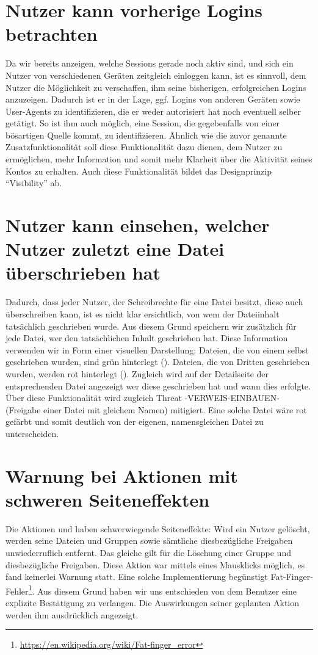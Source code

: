 \documentclass[12pt,DIV14,BCOR10mm,a4paper,parskip=half-,headsepline,headinclude,english,ngerman,bibliography=totocnumbered]{scrreprt}
\begin{document}
\section{Nutzer kann vorherige Logins betrachten}

Da wir bereits anzeigen, welche Sessions gerade noch aktiv sind, und sich ein Nutzer von verschiedenen Geräten zeitgleich einloggen kann, ist es sinnvoll, dem Nutzer die Möglichkeit zu verschaffen, ihm seine bisherigen, erfolgreichen Logins anzuzeigen.
Dadurch ist er in der Lage, ggf. Logins von anderen Geräten sowie User-Agents zu identifizieren, die er weder autorisiert hat noch eventuell selber getätigt.
So ist ihm auch möglich, eine Session, die gegebenfalls von einer bösartigen Quelle kommt, zu identifizieren.
Ähnlich wie die zuvor genannte Zusatzfunktionalität soll diese Funktionalität dazu dienen, dem Nutzer zu ermöglichen, mehr Information und somit mehr Klarheit über die Aktivität seines Kontos zu erhalten.
Auch diese Funktionalität bildet das Designprinzip \enquote{Visibility} ab.

\section{Nutzer kann einsehen, welcher Nutzer zuletzt eine Datei überschrieben hat}
Dadurch, dass jeder Nutzer, der Schreibrechte für eine Datei besitzt, diese auch überschreiben kann, ist es nicht klar ersichtlich, von wem der Dateiinhalt tatsächlich geschrieben wurde. Aus diesem Grund speichern wir zusätzlich für jede Datei, wer den tatsächlichen Inhalt geschrieben hat. Diese Information verwenden wir in Form einer visuellen Darstellung: Dateien, die von einem selbst geschrieben wurden, sind grün hinterlegt (). Dateien, die von Dritten geschrieben wurden, werden rot hinterlegt (). Zugleich wird auf der Detailseite der entsprechenden Datei angezeigt wer diese geschrieben hat und wann dies erfolgte.
Über diese Funktionalität wird zugleich Threat -VERWEIS-EINBAUEN- (Freigabe einer Datei mit gleichem Namen) mitigiert. Eine solche Datei wäre rot gefärbt und somit deutlich von der eigenen, namensgleichen Datei zu unterscheiden.

\section{Warnung bei Aktionen mit schweren Seiteneffekten}
\label{warning:severe:sideeffects}
Die Aktionen  und  haben schwerwiegende Seiteneffekte: Wird ein Nutzer gelöscht, werden seine Dateien und Gruppen sowie sämtliche diesbezügliche Freigaben unwiederruflich entfernt. Das gleiche gilt für die Löschung einer Gruppe und diesbezügliche Freigaben. Diese Aktion war mittels eines Mausklicks möglich, es fand keinerlei Warnung statt. Eine solche Implementierung begünstigt Fat-Finger-Fehler\footnote{\url{https://en.wikipedia.org/wiki/Fat-finger_error}}. Aus diesem Grund haben wir uns entschieden von dem Benutzer eine explizite Bestätigung zu verlangen. Die Auswirkungen seiner geplanten Aktion werden ihm ausdrücklich angezeigt.
\end{document}
